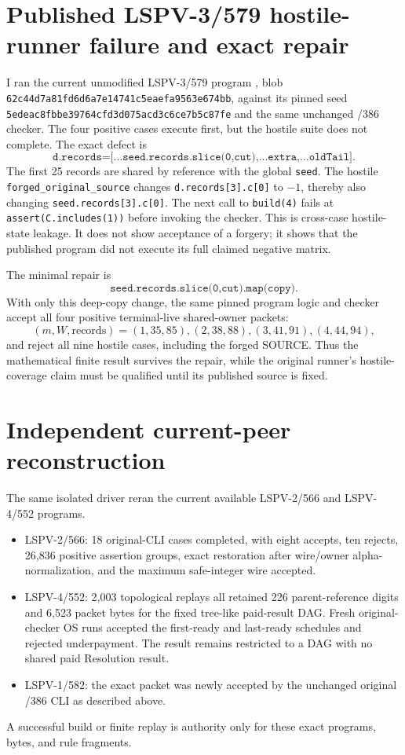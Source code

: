 \documentclass[11pt]{article}
\begin{document}
\section{Published LSPV-3/579 hostile-runner failure and exact repair}
I ran the current unmodified LSPV-3/579 program
, blob
\texttt{62c44d7a81fd6d6a7e14741c5eaefa9563e674bb}, against its pinned seed
\texttt{5edeac8fbbe39764cfd3d075acd3c6ce7b5c87fe} and the same unchanged
/386 checker.  The four positive cases execute first, but the hostile suite
does not complete.  The exact defect is
\[
\texttt{d.records=[...seed.records.slice(0,cut),...extra,...oldTail]}.
\]
The first 25 records are shared by reference with the global
\texttt{seed}.  The hostile
\texttt{forged\_original\_source} changes
\texttt{d.records[3].c[0]} to \(-1\), thereby also changing
\texttt{seed.records[3].c[0]}.  The next call to \texttt{build(4)}
fails at \texttt{assert(C.includes(1))} before invoking the checker.
This is cross-case hostile-state leakage.  It does not show acceptance of a
forgery; it shows that the published program did not execute its full claimed
negative matrix.

The minimal repair is
\[
\texttt{seed.records.slice(0,cut).map(copy)}.
\]
With only this deep-copy change, the same pinned program logic and checker
accept all four positive terminal-live shared-owner packets:
\[
 (m,W,\text{records})=(1,35,85),(2,38,88),(3,41,91),(4,44,94),
\]
and reject all nine hostile cases, including the forged SOURCE.  Thus the
mathematical finite result survives the repair, while the original runner's
hostile-coverage claim must be qualified until its published source is fixed.

\section{Independent current-peer reconstruction}
The same isolated driver reran the current available LSPV-2/566 and
LSPV-4/552 programs.
\begin{itemize}
\item LSPV-2/566: 18 original-CLI cases completed, with eight accepts, ten
rejects, 26,836 positive assertion groups, exact restoration after wire/owner
alpha-normalization, and the maximum safe-integer wire accepted.
\item LSPV-4/552: 2,003 topological replays all retained 226 parent-reference
digits and 6,523 packet bytes for the fixed tree-like paid-result DAG.  Fresh
original-checker OS runs accepted the first-ready and last-ready schedules and
rejected underpayment.  The result remains restricted to a DAG with no shared
paid Resolution result.
\item LSPV-1/582: the exact packet was newly accepted by the unchanged
original /386 CLI as described above.
\end{itemize}
A successful build or finite replay is authority only for these exact programs,
bytes, and rule fragments.
\end{document}
